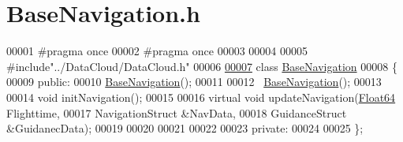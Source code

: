 \hypertarget{_base_navigation_8h_source}{}\section{Base\+Navigation.\+h}
\label{_base_navigation_8h_source}

\begin{DoxyCode}
00001 \textcolor{preprocessor}{#pragma once}
00002 \textcolor{preprocessor}{#pragma once}
00003 
00004 
00005 \textcolor{preprocessor}{#include"../DataCloud/DataCloud.h"}
00006 
\hyperlink{class_base_navigation}{00007} \textcolor{keyword}{class }\hyperlink{class_base_navigation}{BaseNavigation}
00008 \{
00009 \textcolor{keyword}{public}:
00010     \hyperlink{class_base_navigation}{BaseNavigation}();
00011 
00012     ~\hyperlink{class_base_navigation}{BaseNavigation}();
00013 
00014     \textcolor{keywordtype}{void} initNavigation();
00015 
00016     \textcolor{keyword}{virtual} \textcolor{keywordtype}{void} updateNavigation(\hyperlink{group___tools_ga3f1431cb9f76da10f59246d1d743dc2c}{Float64} Flighttime, 
00017                           NavigationStruct &NavData,
00018                           GuidanceStruct &GuidanecData);
00019 
00020 
00021 
00022 
00023 \textcolor{keyword}{private}:
00024 
00025 \};
\end{DoxyCode}
